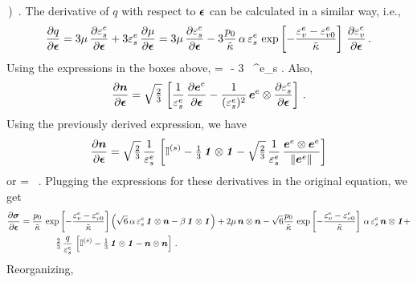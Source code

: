             \beta\,\Bone \right) \,.
\Eeq
The derivative of $q$ with respect to $\Beps$ can be calculated in a similar way, i.e.,
\[
  \Partial{q}{\Beps} = 3\mu\,\Partial{\Ve^e_s}{\Beps} + 3\Ve^e_s\,\Partial{\mu}{\Beps}
   = 3\mu\,\Partial{\Ve^e_s}{\Beps} - 3\frac{p_0}{\kappatilde}\,\alpha\,\Ve^e_s\,
      \exp\left[-\frac{\Ve^e_v - \Ve^e_{v0}}{\kappatilde}\right]\,\Partial{\Ve^e_v}{\Beps} \,.
\]
Using the expressions in the boxes above, 
\Beq
   = \,\mu\,\BnT - 3\,
      \exp{}\,\alpha\,\Ve^e_s\,\Bone \,.
\Eeq
Also,
\[
   \Partial{\BnT}{\Beps} = \sqrt{\tfrac{2}{3}}\,\left[\frac{1}{\Ve^e_s}\,\Partial{\BeT^e}{\Beps}
     - \frac{1}{(\Ve^e_s)^2}\,\BeT^e\otimes\Partial{\Ve^e_s}{\Beps}\right] \,.
\]
Using the previously derived expression, we have
\[
   \Partial{\BnT}{\Beps} = \sqrt{\tfrac{2}{3}}\,\frac{1}{\Ve^e_s}\,\left[
        \SfI^{(s)} - \tfrac{1}{3}\,\Bone\otimes\Bone
     - \sqrt{\tfrac{2}{3}}\,\frac{1}{\Ve^e_s}\,\frac{\BeT^e\otimes\BeT^e}{\Norm{\BeT^e}{}}\right] 
\]
or
\Beq
   \Partial{\BnT}{\Beps} = \,\, \,.
\Eeq
Plugging the expressions for these derivatives in the original equation, we get
\[
  \Bal
   \Partial{\Bsig}{\Beps} & = \frac{p_0}{\kappatilde}\,
      \exp\left[-\frac{\Ve^e_v - \Ve^e_{v0}}{\kappatilde}\right]
      \left(\sqrt{6}\,\alpha\,\Ve^e_s\,\Bone\otimes\BnT - \beta\,\Bone\otimes\Bone \right) + 
      2\mu\,\BnT\otimes\BnT - \sqrt{6}\frac{p_0}{\kappatilde}\,
      \exp\left[-\frac{\Ve^e_v - \Ve^e_{v0}}{\kappatilde}\right]\,\alpha\,\Ve^e_s\,\BnT\otimes\Bone +\\
      & \qquad \qquad \tfrac{2}{3}\,\frac{q}{\Ve^e_s}\,\left[
        \SfI^{(s)} - \tfrac{1}{3}\,\Bone\otimes\Bone - \BnT\otimes\BnT\right] \,.
  \Eal
\]
Reorganizing,
\Beq
\Eeq

